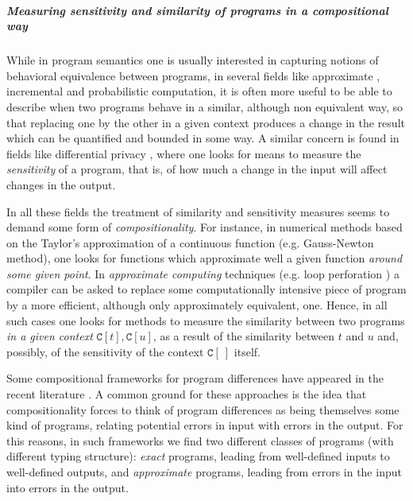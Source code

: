 
\subparagraph*{Measuring sensitivity and similarity of programs in a compositional way}
While in program semantics one is usually interested in capturing notions of behavioral equivalence between programs, 
in several fields like approximate \cite{Mittal2016}, incremental \cite{Cai2014, Picallo2019} and probabilistic \cite{10.1109/LICS.2015.64} computation, it is often more useful to be able to describe when two programs behave in a similar, although non equivalent way, so that replacing one by the other in a given context produces a change in the result which can be quantified and bounded in some way.
A similar concern is found in fields like differential privacy \cite{10.1145/1932681.1863568, 10.1007/978-3-642-29420-4_3, Barthe_2012}, where one looks for means to measure the \emph{sensitivity} of a program, that is, of how much a change in the input will affect changes in the output.



In all these fields the treatment of similarity and sensitivity measures seems to demand some form of \emph{compositionality}. 
For instance, in numerical methods based on the Taylor's approximation of a continuous function (e.g. Gauss-Newton method), one looks for functions which approximate well a given function \emph{around some given point}. 
In \emph{approximate computing} techniques (e.g. loop perforation \cite{loopperf}) a compiler can be asked to replace some computationally intensive piece of program by a more efficient, although only approximately equivalent, one.
Hence, in all such cases one looks for methods to measure the similarity between two programs \emph{in a given context} $\mathtt C[t], \mathtt C[u]$, as a result of the similarity between $t$ and $u$ and, possibly, of the sensitivity of the context $\mathtt C[\ ]$ itself. 

Some compositional frameworks for program differences have appeared in the recent literature \cite{chaudhuri, dallago:differential-stlc}. A common ground for these approaches is the idea that compositionality forces to think of program differences as being themselves some kind of programs, relating potential errors in input with errors in the output. For this reasons, in such frameworks we find two different classes of programs (with different typing structure): \emph{exact} programs, leading from well-defined inputs to well-defined outputs, and \emph{approximate} programs, leading from errors in the input into errors in the output.

